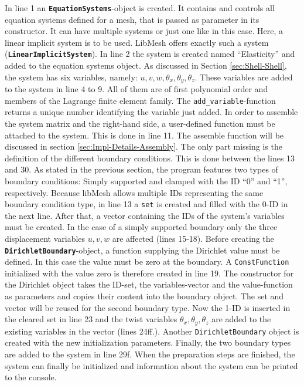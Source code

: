    In line 1 an \texttt{\textbf{EquationSystems}}-object is created. It contains and controls all equation systems defined for a mesh, that is passed as parameter in its constructor. It can have multiple systems or just one like in this case. Here, a linear implicit system is to be used. LibMesh offers exactly such a system (\texttt{\textbf{LinearImplicitSystem}}). In line 2 the system is created named ``Elasticity'' and added to the equation systems object. As discussed in Section \ref{sec:Shell-Shell}, the system has six variables, namely: $u, v, w, \theta_x, \theta_y, \theta_z$. These variables are added to the system in line 4 to 9. All of them are of first polynomial order and members of the Lagrange finite element family. The \texttt{add\_variable}-function returns a unique number identifying the variable just added. In order to assemble the system matrix and the right-hand side, a user-defined function must be attached to the system. This is done in line 11. The assemble function will be discussed in section \ref{sec:Impl-Details-Assembly}. The only part missing is the definition of the different boundary conditions. This is done between the lines 13 and 30. As stated in the previous section, the program features two types of boundary conditions: Simply supported and clamped with the ID ``0'' and ``1'', respectively. Because libMesh allows multiple IDs representing the same boundary condition type, in line 13 a \texttt{set} is created and filled with the 0-ID in the next line. After that, a vector containing the IDs of the system's variables must be created. In the case of a simply supported boundary only the three displacement variables $u,v,w$ are affected (lines 15-18). Before creating the \texttt{\textbf{DirichletBoundary}}-object, a function supplying the Dirichlet value must be defined. In this case the value must be zero at the boundary. A \texttt{ConstFunction} initialized with the value zero is therefore created in line 19. The constructor for the Dirichlet object takes the ID-set, the variables-vector and the value-function as parameters and copies their content into the boundary object. The set and vector will be reused for the second boundary type. Now the 1-ID is inserted in the cleared set in line 23 and the twist variables $\theta_x, \theta_y, \theta_z$ are added to the existing variables in the vector (lines 24ff.). Another \texttt{DirichletBoundary} object is created with the new initialization parameters. Finally, the two boundary types are added to the system in line 29f. When the preparation steps are finished, the system can finally be initialized and information about the system can be printed to the console.
     

